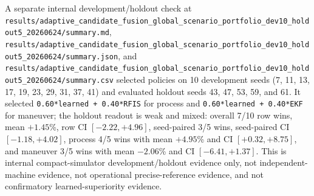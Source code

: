 \documentclass{article}
\begin{document}
A separate internal development/holdout check at \nolinkurl{results/adaptive_candidate_fusion_global_scenario_portfolio_dev10_holdout5_20260624/summary.md}, \nolinkurl{results/adaptive_candidate_fusion_global_scenario_portfolio_dev10_holdout5_20260624/summary.json}, and \nolinkurl{results/adaptive_candidate_fusion_global_scenario_portfolio_dev10_holdout5_20260624/summary.csv} selected policies on 10 development seeds (7, 11, 13, 17, 19, 23, 29, 31, 37, 41) and evaluated holdout seeds 43, 47, 53, 59, and 61. It selected \texttt{0.60*learned + 0.40*RFIS} for process and \texttt{0.60*learned + 0.40*EKF} for maneuver; the holdout readout is weak and mixed: overall 7/10 row wins, mean \(+1.45\)\%, row CI \([-2.22,+4.96]\), seed-paired 3/5 wins, seed-paired CI \([-1.18,+4.02]\), process 4/5 wins with mean \(+4.95\)\% and CI \([+0.32,+8.75]\), and maneuver 3/5 wins with mean \(-2.06\)\% and CI \([-6.41,+1.37]\). This is internal compact-simulator development/holdout evidence only, not independent-machine evidence, not operational precise-reference evidence, and not confirmatory learned-superiority evidence.
\end{document}
